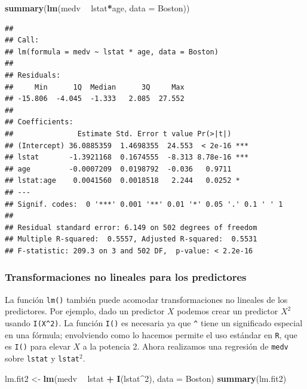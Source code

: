 \documentclass[]{book}
\newenvironment{Shaded}{\begin{snugshade}}{\end{snugshade}}
\newcommand{\KeywordTok}[1]{\textcolor[rgb]{0.13,0.29,0.53}{\textbf{#1}}}
\newcommand{\DataTypeTok}[1]{\textcolor[rgb]{0.13,0.29,0.53}{#1}}
\newcommand{\DecValTok}[1]{\textcolor[rgb]{0.00,0.00,0.81}{#1}}
\newcommand{\StringTok}[1]{\textcolor[rgb]{0.31,0.60,0.02}{#1}}
\newcommand{\OperatorTok}[1]{\textcolor[rgb]{0.81,0.36,0.00}{\textbf{#1}}}
\newcommand{\NormalTok}[1]{#1}
\begin{document}
\begin{Shaded}
\begin{Highlighting}[]
\KeywordTok{summary}\NormalTok{(}\KeywordTok{lm}\NormalTok{(medv }\OperatorTok{~}\StringTok{ }\NormalTok{lstat}\OperatorTok{*}\NormalTok{age, }\DataTypeTok{data =}\NormalTok{ Boston))}
\end{Highlighting}
\end{Shaded}

\begin{verbatim}
## 
## Call:
## lm(formula = medv ~ lstat * age, data = Boston)
## 
## Residuals:
##     Min      1Q  Median      3Q     Max 
## -15.806  -4.045  -1.333   2.085  27.552 
## 
## Coefficients:
##               Estimate Std. Error t value Pr(>|t|)    
## (Intercept) 36.0885359  1.4698355  24.553  < 2e-16 ***
## lstat       -1.3921168  0.1674555  -8.313 8.78e-16 ***
## age         -0.0007209  0.0198792  -0.036   0.9711    
## lstat:age    0.0041560  0.0018518   2.244   0.0252 *  
## ---
## Signif. codes:  0 '***' 0.001 '**' 0.01 '*' 0.05 '.' 0.1 ' ' 1
## 
## Residual standard error: 6.149 on 502 degrees of freedom
## Multiple R-squared:  0.5557, Adjusted R-squared:  0.5531 
## F-statistic: 209.3 on 3 and 502 DF,  p-value: < 2.2e-16
\end{verbatim}

\subsubsection{Transformaciones no lineales para los
predictores}\label{transformaciones-no-lineales-para-los-predictores}

La función \texttt{lm()} también puede acomodar transformaciones no
lineales de los predictores. Por ejemplo, dado un predictor \(X\)
podemos crear un predictor \(X^2\) usando \texttt{I(X\^{}2)}. La función
\texttt{I()} es necesaria ya que \texttt{\^{}} tiene un significado
especial en una fórmula; envolviendo como lo hacemos permite el uso
estándar en \texttt{R}, que es \texttt{I()} para elevar \(X\) a la
potencia 2. Ahora realizamos una regresión de \texttt{medv} sobre
\texttt{lstat} y \texttt{lstat}\(^2\).

\begin{Shaded}
\begin{Highlighting}[]
\NormalTok{lm.fit2 <-}\StringTok{ }\KeywordTok{lm}\NormalTok{(medv }\OperatorTok{~}\StringTok{ }\NormalTok{lstat }\OperatorTok{+}\StringTok{ }\KeywordTok{I}\NormalTok{(lstat}\OperatorTok{^}\DecValTok{2}\NormalTok{), }\DataTypeTok{data =}\NormalTok{ Boston)}
\KeywordTok{summary}\NormalTok{(lm.fit2)}
\end{Highlighting}
\end{Shaded}
\end{document}
